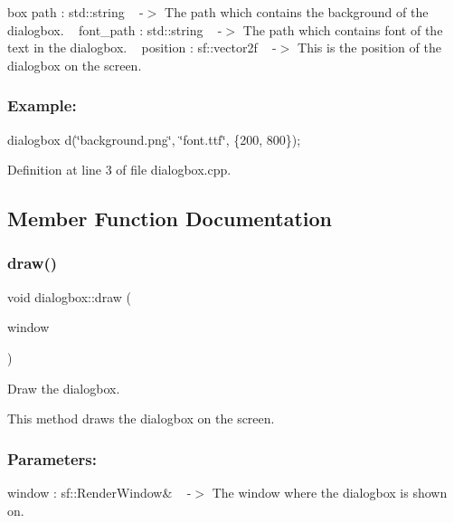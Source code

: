 box path \+: std\+::string ~\newline
-\/$>$ The path which contains the background of the dialogbox. ~\newline
 font\+\_\+path \+: std\+::string ~\newline
-\/$>$ The path which contains font of the text in the dialogbox. ~\newline
 position \+: sf\+::vector2f ~\newline
-\/$>$ This is the position of the dialogbox on the screen. ~\newline
 \subsubsection*{Example\+: }

dialogbox d(\char`\"{}background.\+png\char`\"{}, \char`\"{}font.\+ttf\char`\"{}, \{200, 800\}); 

Definition at line 3 of file dialogbox.\+cpp.



\subsection{Member Function Documentation}
\mbox{\label{classdialogbox_a722438dee05d120c77871b1ec9d26cf5}} 
\subsubsection{\texorpdfstring{draw()}{draw()}}
{\footnotesize\ttfamily void dialogbox\+::draw (\begin{DoxyParamCaption}\item[{sf\+::\+Render\+Window \&}]{window }\end{DoxyParamCaption})}



Draw the dialogbox. 

This method draws the dialogbox on the screen.

\subsubsection*{Parameters\+: }

window \+: sf\+::\+Render\+Window\& ~\newline
-\/$>$ The window where the dialogbox is shown on. ~\newline


